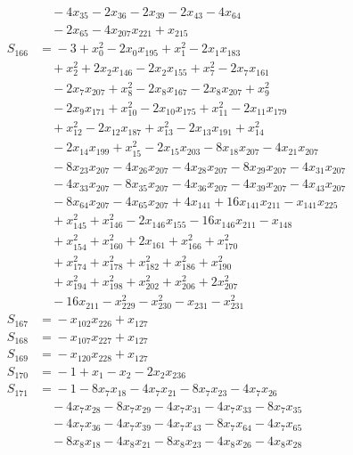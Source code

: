 \begin{align*}
&\quad{} -4x_{35} -2x_{36} -2x_{39} -2x_{43} -4x_{64} \\
&\quad{} -2x_{65} -4x_{207}x_{221} +x_{215} \\
S_{166} &={} -3 +x_{0}^{2} -2x_{0}x_{195} +x_{1}^{2} -2x_{1}x_{183} \\
&\quad{} +x_{2}^{2} +2x_{2}x_{146} -2x_{2}x_{155} +x_{7}^{2} -2x_{7}x_{161} \\
&\quad{} -2x_{7}x_{207} +x_{8}^{2} -2x_{8}x_{167} -2x_{8}x_{207} +x_{9}^{2} \\
&\quad{} -2x_{9}x_{171} +x_{10}^{2} -2x_{10}x_{175} +x_{11}^{2} -2x_{11}x_{179} \\
&\quad{} +x_{12}^{2} -2x_{12}x_{187} +x_{13}^{2} -2x_{13}x_{191} +x_{14}^{2} \\
&\quad{} -2x_{14}x_{199} +x_{15}^{2} -2x_{15}x_{203} -8x_{18}x_{207} -4x_{21}x_{207} \\
&\quad{} -8x_{23}x_{207} -4x_{26}x_{207} -4x_{28}x_{207} -8x_{29}x_{207} -4x_{31}x_{207} \\
&\quad{} -4x_{33}x_{207} -8x_{35}x_{207} -4x_{36}x_{207} -4x_{39}x_{207} -4x_{43}x_{207} \\
&\quad{} -8x_{64}x_{207} -4x_{65}x_{207} +4x_{141} +16x_{141}x_{211} -x_{141}x_{225} \\
&\quad{} +x_{145}^{2} +x_{146}^{2} -2x_{146}x_{155} -16x_{146}x_{211} -x_{148} \\
&\quad{} +x_{154}^{2} +x_{160}^{2} +2x_{161} +x_{166}^{2} +x_{170}^{2} \\
&\quad{} +x_{174}^{2} +x_{178}^{2} +x_{182}^{2} +x_{186}^{2} +x_{190}^{2} \\
&\quad{} +x_{194}^{2} +x_{198}^{2} +x_{202}^{2} +x_{206}^{2} +2x_{207}^{2} \\
&\quad{} -16x_{211} -x_{229}^{2} -x_{230}^{2} -x_{231} -x_{231}^{2} \\
S_{167} &={} -x_{102}x_{226} +x_{127} \\
S_{168} &={} -x_{107}x_{227} +x_{127} \\
S_{169} &={} -x_{120}x_{228} +x_{127} \\
S_{170} &={} -1 +x_{1} -x_{2} -2x_{2}x_{236} \\
S_{171} &={} -1 -8x_{7}x_{18} -4x_{7}x_{21} -8x_{7}x_{23} -4x_{7}x_{26} \\
&\quad{} -4x_{7}x_{28} -8x_{7}x_{29} -4x_{7}x_{31} -4x_{7}x_{33} -8x_{7}x_{35} \\
&\quad{} -4x_{7}x_{36} -4x_{7}x_{39} -4x_{7}x_{43} -8x_{7}x_{64} -4x_{7}x_{65} \\
&\quad{} -8x_{8}x_{18} -4x_{8}x_{21} -8x_{8}x_{23} -4x_{8}x_{26} -4x_{8}x_{28} \\

\end{align*}
